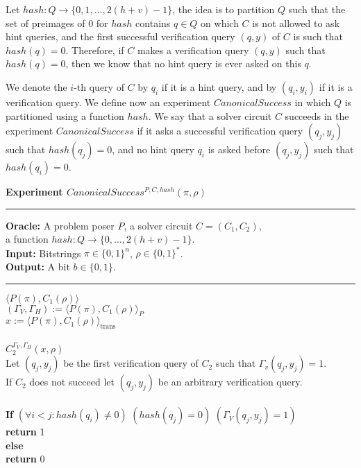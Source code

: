 
Let $hash:Q\rightarrow\{0,1,\dots, 2(h+v)-1\}$,
the idea is to partition $Q$ such that the set of preimages of $0$ for $hash$ contains $q \in Q$ on which $C$ is not allowed to ask hint queries,
and the first successful verification query $(q,y)$ of $C$ is such that $hash(q) = 0$.
Therefore, if $C$ makes a verification query $(q,y)$ such that $hash(q) = 0$, then we know that no hint query is ever asked on this $q$.

We denote the $i$-th query of $C$ by $q_i$ if it is a hint query, and by $(q_i, y_i)$ if it is a verification query.
We define now an experiment $CanonicalSuccess$ in which $Q$ is partitioned using a function $hash$.
We say that a solver circuit $C$ succeeds in the experiment $CanonicalSuccess$
if it asks a successful verification query $(q_j, y_j)$ such that $hash(q_j) = 0$,
and no hint query $q_i$ is asked before $(q_j, y_j)$ such that $hash(q_i) = 0$.
%
\begin{codeblock}
  \textbf{Experiment $CanonicalSuccess^{P, C, hash}(\pi, \rho)$}
  \medskip
  \hrule
  \medskip
  \textbf{Oracle:} A problem poser $P$, a solver circuit $C = (C_1, C_2)$,\\
  \IndII a function $hash: Q \rightarrow \{0, \dots, 2(h+v) - 1\}$.\\
  \textbf{Input:}  Bitstrings $\pi \in \{0,1\}^n$, $\rho \in \{0,1\}^*$. \\
  \textbf{Output:} A bit $b \in \{0,1\}$.

  \medskip\hrule\medskip
  \Run $\langle P(\pi), C_1(\rho) \rangle$ \\
  \IndI $(\Gamma_V, \Gamma_H) := \langle P(\pi), C_1(\rho) \rangle_{P}$ \\
  \IndI $x := \langle P(\pi), C_1(\rho) \rangle_{\text{trans}}$ \\ \\
  \Run $C_2^{\Gamma_V, \Gamma_H} (x, \rho)$ \\
  \IndI Let $(q_j,y_j)$ be the first verification query of $C_2$ such that $\Gamma_v(q_j, y_j) = 1$.\\
  \IndI If $C_2$ does not succeed let $(q_j, y_j)$ be an arbitrary verification query.\\
  \\
  \textbf{If} $(\forall i < j :  hash(q_i) \neq 0)$ \And $(hash(q_j) = 0)$ \And $(\Gamma_V(q_j, y_j) = 1)$ \then \\
  \IndI \textbf{return} 1\\
  \textbf{else}\\
  \IndI \textbf{return} 0
\end{codeblock}

